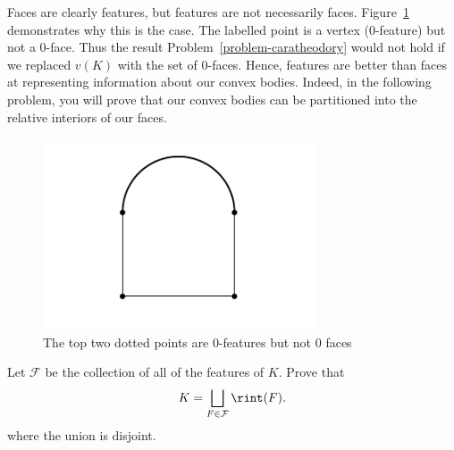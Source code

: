 \documentclass[11pt]{article}
\begin{document}
Faces are clearly features, but features are not necessarily faces. Figure~\ref{weird} demonstrates why this is the case. The labelled point is a vertex (0-feature) but not a 0-face. Thus the result Problem~\ref{problem-caratheodory} would not hold if we replaced $v(K)$ with the set of $0$-faces. Hence, features are better than faces at representing information about our convex bodies. Indeed, in the following problem, you will prove that our convex bodies can be partitioned into the relative interiors of our faces. 

\begin{figure}[h]
    \begin{center}
        \includegraphics[scale = 1]{../images/image5.png}
        \caption{The top two dotted points are $0$-features but not $0$ faces}
        \label{weird}
    \end{center}
\end{figure}
 
\begin{prob}[15 points]
    Let $\mathcal{F}$ be the collection of all of the features of $K$. Prove that 
    \[
        K = \bigsqcup_{F \in \mathcal{F}} \rint (F).
    \]
    where the union is disjoint. 
\end{prob}
\end{document}
